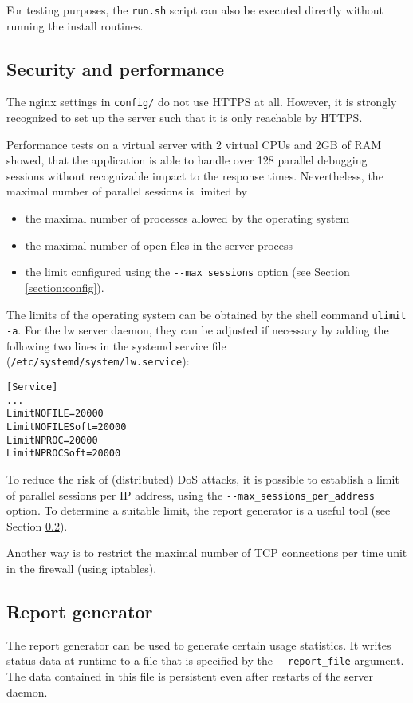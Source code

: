 For testing purposes, the \verb|run.sh| script can also be executed directly without running the install routines.

\subsection{Security and performance}
The nginx settings in \verb|config/| do not use HTTPS at all. However, it is strongly recognized
to set up the server such that it is only reachable by HTTPS.

Performance tests on a virtual server with 2 virtual CPUs and 2GB of RAM showed, that the application is able to handle over 128 parallel debugging
sessions without recognizable impact to the response times. Nevertheless, the maximal number of parallel sessions is
limited by
\begin{itemize}
    \item the maximal number of processes allowed by the operating system
    \item the maximal number of open files in the server process
    \item the limit configured using the \verb|--max_sessions| option (see Section \ref{section:config}).
\end{itemize}

The limits of the operating system can be obtained by the shell command \verb|ulimit -a|.
For the lw server daemon, they can be adjusted if necessary by adding the following two lines
in the systemd service file (\verb|/etc/systemd/system/lw.service|):
\begin{verbatim}
[Service]
...
LimitNOFILE=20000
LimitNOFILESoft=20000
LimitNPROC=20000
LimitNPROCSoft=20000
\end{verbatim}

To reduce the risk of (distributed) DoS attacks, it is
possible to establish a limit of parallel sessions per IP address, using the \verb|--max_sessions_per_address| option.
To determine a suitable limit, the report generator is a useful tool (see Section \ref{section:reportgen}).

Another way is to restrict the maximal number of TCP connections per time unit in the firewall (using iptables).

\subsection{Report generator}
\label{section:reportgen}
The report generator can be used to generate certain usage statistics. It writes status data at runtime to a
file that is specified by the \verb|--report_file| argument. The data contained in this file is persistent
even after restarts of the server daemon.

